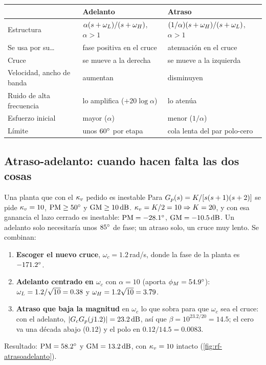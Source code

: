 
\begin{anchocompleto}
\centering\small
\begin{tabular}{@{}lll@{}}
\toprule
 & \textbf{Adelanto} & \textbf{Atraso}\\
\midrule
Estructura & $\alpha(s+\omega_L)/(s+\omega_H)$, $\alpha>1$ & $(1/\alpha)(s+\omega_H)/(s+\omega_L)$, $\alpha>1$\\
Se usa por su\ldots & fase positiva en el cruce & atenuación en el cruce\\
Cruce & se mueve a la derecha & se mueve a la izquierda\\
Velocidad, ancho de banda & aumentan & disminuyen\\
Ruido de alta frecuencia & lo amplifica ($+20\log\alpha$) & lo atenúa\\
Esfuerzo inicial & mayor ($\alpha$) & menor ($1/\alpha$)\\
Límite & unos $60^{\circ}$ por etapa & cola lenta del par polo-cero\\
\bottomrule
\end{tabular}
\label{tab:rf-resumencomp}
\end{anchocompleto}

\subsection{Atraso-adelanto: cuando hacen falta las dos cosas}

\begin{ejemplo}[label=ej:rf-atrasoadelanto]{Una planta que con el $\kappa_v$ pedido es inestable}
Para $G_p(s)=K/[s(s+1)(s+2)]$ se pide $\kappa_v=10$, $\mathrm{PM}\geq50^{\circ}$ y $\mathrm{GM}\geq10\,\mathrm{dB}$.
\solucion $\kappa_v=K/2=10\Rightarrow K=20$, y con esa ganancia el lazo cerrado es inestable: $\mathrm{PM}=-28.1^{\circ}$, $\mathrm{GM}=-10.5\,\mathrm{dB}$. Un adelanto solo necesitaría unos $85^{\circ}$ de fase; un atraso solo, un cruce muy lento. Se combinan:
\begin{enumerate}
  \item \textbf{Escoger el nuevo cruce}, $\omega_c=1.2$\,rad/s, donde la fase de la planta es $-171.2^{\circ}$.
  \item \textbf{Adelanto centrado en $\omega_c$} con $\alpha=10$ (aporta $\phi_M=54.9^{\circ}$): $\omega_L=1.2/\sqrt{10}=0.38$ y $\omega_H=1.2\sqrt{10}=3.79$.
  \item \textbf{Atraso que baja la magnitud} en $\omega_c$ lo que sobra para que $\omega_c$ sea el cruce: con el adelanto, $|G_cG_p(j1.2)|=23.2\,\mathrm{dB}$, así que $\beta=10^{23.2/20}=14.5$; el cero va una década abajo ($0.12$) y el polo en $0.12/14.5=0.0083$.
\end{enumerate}
Resultado: $\mathrm{PM}=58.2^{\circ}$ y $\mathrm{GM}=13.2\,\mathrm{dB}$, con $\kappa_v=10$ intacto (\cref{fig:rf-atrasoadelanto}).
\end{ejemplo}

